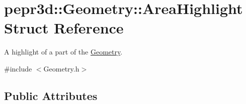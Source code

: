 \hypertarget{structpepr3d_1_1_geometry_1_1_area_highlight}{}\section{pepr3d\+::Geometry\+::Area\+Highlight Struct Reference}
\label{structpepr3d_1_1_geometry_1_1_area_highlight}


A highlight of a part of the \mbox{\hyperlink{classpepr3d_1_1_geometry}{Geometry}}.  




{\ttfamily \#include $<$Geometry.\+h$>$}

\subsection*{Public Attributes}

